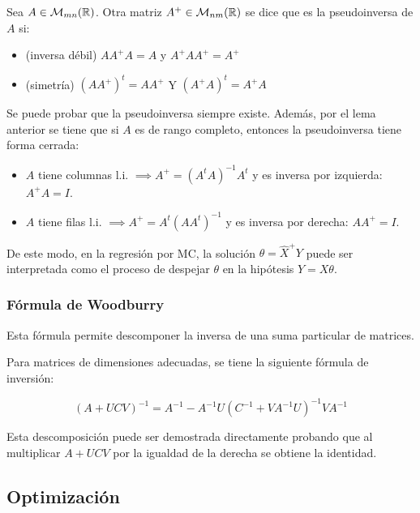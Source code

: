 \begin{definition} Sea $A\in\mathcal{M}_{mn}({\mathbb R})$. Otra matriz $A^+\in\mathcal{M}_{nm}({\mathbb R})$ se dice que es la pseudoinversa de $A$ si:

\begin{itemize}
	\item (inversa débil) $AA^+A=A$ y $A^+AA^+=A^+$
	\item (simetría) $(AA^+)^t = AA^+$ Y $(A^+A)^t = A^+A$
\end{itemize}
	
\end{definition}

Se puede probar que la pseudoinversa siempre existe. Además, por el lema anterior se tiene que si $A$ es de rango completo, entonces la pseudoinversa tiene forma cerrada:

\begin{itemize}
	\item $A$ tiene columnas l.i. $\implies A^+=(A^tA)^{-1}A^t$ y es inversa por izquierda: $A^+A=I$.
	\item $A$ tiene filas l.i. $\implies A^+=A^t(AA^t)^{-1}$ y es inversa por derecha: $AA^+=I$.
\end{itemize}

De este modo, en la regresión por MC, la solución $\theta=\hat{X}^+Y$ puede ser interpretada como el proceso de despejar $\theta$ en la hipótesis $Y=X\theta$.

\subsubsection{Fórmula de Woodburry}

Esta fórmula permite descomponer la inversa de una suma particular de matrices.

\begin{theorem}
	Para matrices de dimensiones adecuadas, se tiene la siguiente fórmula de inversión:
	
	\begin{equation*}
		(A+UCV)^{-1} = A^{-1} - A^{-1}U(C^{-1}+VA^{-1}U)^{-1}VA^{-1}
	\end{equation*}
\end{theorem}

Esta descomposición puede ser demostrada directamente probando que al multiplicar $A+UCV$ por la igualdad de la derecha se obtiene la identidad.


\subsection{Optimización}
